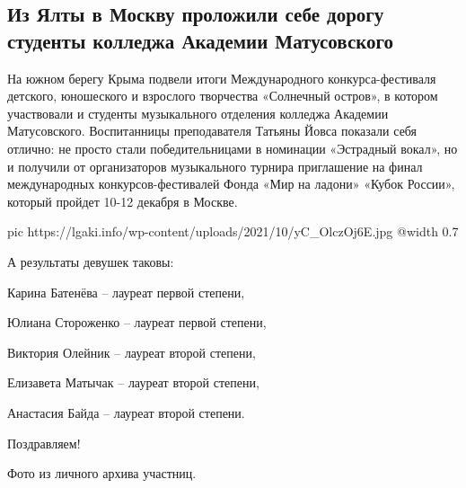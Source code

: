  
 
 
 
 
\subsection{Из Ялты в Москву проложили себе дорогу студенты колледжа Академии Матусовского}
\label{sec:11_10_2021.stz.edu.lnr.lgaki.1.jalta_konkurs}


На южном берегу Крыма подвели итоги Международного конкурса-фестиваля детского,
юношеского и взрослого творчества «Солнечный остров», в котором участвовали и
студенты музыкального отделения колледжа Академии Матусовского. Воспитанницы
преподавателя Татьяны Йовса показали себя отлично: не просто стали
победительницами в номинации «Эстрадный вокал», но и получили от организаторов
музыкального турнира приглашение на финал международных конкурсов-фестивалей
Фонда «Мир на ладони» «Кубок России», который пройдет 10-12 декабря в Москве.

\ifcmt
  pic https://lgaki.info/wp-content/uploads/2021/10/yC_OlczOj6E.jpg
  @width 0.7
\fi

А результаты девушек таковы:

Карина Батенёва – лауреат первой степени,

Юлиана Стороженко – лауреат первой степени,

Виктория Олейник – лауреат второй степени,

Елизавета Матычак – лауреат второй степени,

Анастасия Байда – лауреат второй степени.

Поздравляем!

 

Фото из личного архива участниц.
